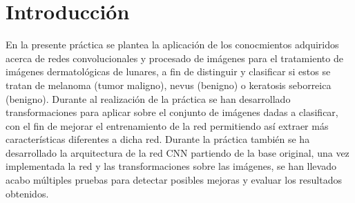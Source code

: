 \section{Introducción}

En la presente práctica se plantea la aplicación de los conocmientos adquiridos acerca de redes convolucionales y procesado de imágenes para el tratamiento de imágenes dermatológicas de lunares, 
a fin de distinguir y clasificar si estos se tratan de melanoma (tumor maligno), nevus (benigno) o keratosis seborreica (benigno).
Durante al realización de la práctica se han desarrollado transformaciones para aplicar sobre el conjunto de imágenes dadas a clasificar, con el fin de mejorar el entrenamiento de la red 
permitiendo así extraer más características diferentes a dicha red. Durante la práctica también se ha desarrollado la arquitectura de la red CNN partiendo de la base original, una vez 
implementada la red y las transformaciones sobre las imágenes, se han llevado acabo múltiples pruebas para detectar posibles mejoras y evaluar los resultados obtenidos.










